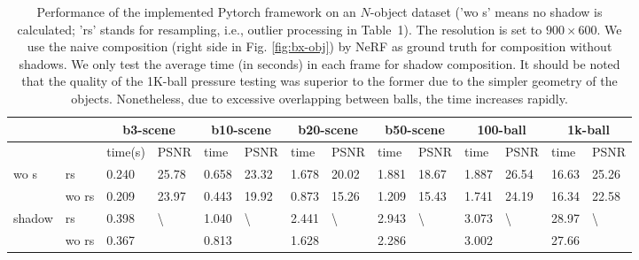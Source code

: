 \documentclass[letterpaper]{article} %
\begin{document}
\begin{table}[tbp]
\begin{tabular}{ll|ll|ll|ll|ll|ll|ll}
\hline
 &
 &
  \multicolumn{2}{c|}{b3-scene} &
  \multicolumn{2}{c|}{b10-scene} &
  \multicolumn{2}{c|}{b20-scene} &
  \multicolumn{2}{c|}{b50-scene} &
  \multicolumn{2}{c|}{100-ball} &
  \multicolumn{2}{c}{1k-ball} \\ \hline
                             &        & time(s) & PSNR & time & PSNR & time & PSNR & time & PSNR & time & PSNR & time & PSNR \\ \hline
\multirow{2}{*}{wo s}        & rs & 0.240    & 25.78       & 0.658    & 23.32       & 1.678    & 20.02      & 1.881    & 18.67       & 1.887    & 26.54   & 16.63    & 25.26       \\
                             & wo rs   & 0.209    & 23.97    & 0.443    & 19.92   & 0.873    & 15.26   & 1.209    &  15.43  & 1.741    & 24.19   & 16.34    & 22.58       \\
\multirow{2}{*}{shadow} & rs & 0.398    & \multirow{2}{*}{\textbackslash}       & 1.040    & \multirow{2}{*}{\textbackslash}       & 2.441    & \multirow{2}{*}{\textbackslash}       & 2.943    & \multirow{2}{*}{\textbackslash}       & 3.073    & \multirow{2}{*}{\textbackslash}       & 28.97    & \multirow{2}{*}{\textbackslash}       \\
                             & wo rs   & 0.367    &        & 0.813    &        & 1.628    &        & 2.286    &        & 3.002    &       & 27.66  &        \\
\hline
\end{tabular}
\caption{Performance of the implemented Pytorch framework on an $N$-object dataset ('wo s' means no shadow is calculated; 'rs' stands for resampling, i.e., outlier processing in Table~1). The resolution is set to $900\times600$. We use the naive composition (right side in Fig. \ref{fig:bx-obj}) by NeRF as ground truth for composition without shadows. We only test the average time (in seconds) in each frame for shadow composition. It should be noted that the quality of the 1K-ball pressure testing was superior to the former due to the simpler geometry of the objects. Nonetheless, due to excessive overlapping between balls, the time increases rapidly.}
\label{tab:bxobj}
\end{table}
\end{document}
